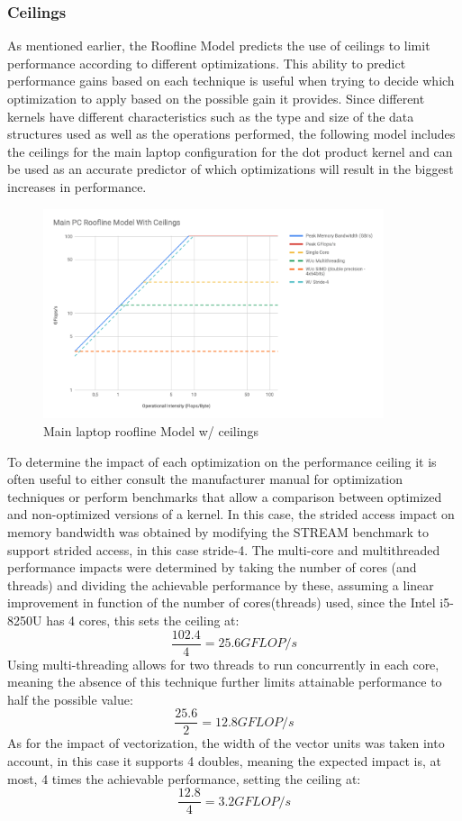 \documentclass{article}
\begin{document}
\subsubsection{Ceilings}
As mentioned earlier, the Roofline Model predicts the use of ceilings to limit performance according to different optimizations. This ability to predict performance 
gains based on each technique is useful when trying to decide which optimization to apply based on the possible gain it provides. Since different kernels have 
different characteristics such as the type and size of the data structures used as well as the operations performed, the following model includes the 
ceilings for the main laptop configuration for the dot product kernel and can be used as an accurate predictor of which optimizations will result in the biggest
increases in performance.
\begin{figure}[H]
    \centering
    \includegraphics[width=10cm]{Pictures/roofline_mainpc_ceilings.png}
\caption{Main laptop roofline Model w/ ceilings}
\end{figure}

To determine the impact of each optimization on the performance ceiling it is often useful to either consult the manufacturer manual for optimization techniques or 
perform benchmarks that allow a comparison between optimized and non-optimized versions of a kernel. In this case, the strided access impact on memory bandwidth was 
obtained by modifying the STREAM benchmark to support strided access, in this case stride-4.
The multi-core and multithreaded performance impacts were determined by taking the number of cores (and threads) and dividing the achievable performance by these,
assuming a linear improvement in function of the number of cores(threads) used, since the Intel i5-8250U has 4 cores, this sets the ceiling at: $$\frac{102.4}{4} = 25.6 GFLOP/s$$
Using multi-threading allows for two threads to run concurrently in each core, meaning the absence of this technique further limits attainable performance to half the possible value: $$\frac{25.6}{2} = 12.8 GFLOP/s$$
As for the impact of vectorization, the width of the vector units was taken into account, in this case it supports 4 doubles, meaning the expected impact is, at most,
4 times the achievable performance, setting the ceiling at: $$\frac{12.8}{4} = 3.2 GFLOP/s$$
\end{document}
